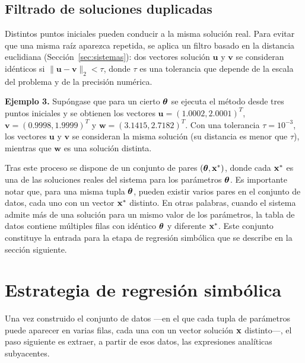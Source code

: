 \subsection{Filtrado de soluciones duplicadas}

Distintos puntos iniciales pueden conducir a la misma solución real. Para evitar que una misma raíz aparezca repetida, se aplica un filtro basado en la distancia euclidiana (Sección~\ref{sec:sistemas}): dos vectores solución \(\mathbf{u}\) y \(\mathbf{v}\) se consideran idénticos si \(\|\mathbf{u} - \mathbf{v}\|_2 < \tau\), donde \(\tau\) es una tolerancia que depende de la escala del problema y de la precisión numérica.

\bigskip \noindent\textbf{Ejemplo 3.} Supóngase que para un cierto \(\boldsymbol{\theta}\) se ejecuta el método desde tres puntos iniciales y se obtienen los vectores \(\mathbf{u} = (1.0002, 2.0001)^T\), \(\mathbf{v} = (0.9998, 1.9999)^T\) y \(\mathbf{w} = (3.1415, 2.7182)^T\). Con una tolerancia \(\tau = 10^{-3}\), los vectores \(\mathbf{u}\) y \(\mathbf{v}\) se consideran la misma solución (su distancia es menor que \(\tau\)), mientras que \(\mathbf{w}\) es una solución distinta.

\bigskip Tras este proceso se dispone de un conjunto de pares \((\boldsymbol{\theta}, \mathbf{x}^*)\), donde cada \(\mathbf{x}^*\) es una de las soluciones reales del sistema para los parámetros \(\boldsymbol{\theta}\). Es importante notar que, para una misma tupla \(\boldsymbol{\theta}\), pueden existir varios pares en el conjunto de datos, cada uno con un vector \(\mathbf{x}^*\) distinto. En otras palabras, cuando el sistema admite más de una solución para un mismo valor de los parámetros, la tabla de datos contiene múltiples filas con idéntico \(\boldsymbol{\theta}\) y diferente \(\mathbf{x}^*\). Este conjunto constituye la entrada para la etapa de regresión simbólica que se describe en la sección siguiente.


\section{Estrategia de regresión simbólica} \label{sec:estrategia_sr}

Una vez construido el conjunto de datos —en el que cada tupla de parámetros puede aparecer en varias filas, cada una con un vector solución \(\mathbf{x}\) distinto—, el paso siguiente es extraer, a partir de esos datos, las expresiones analíticas subyacentes.


